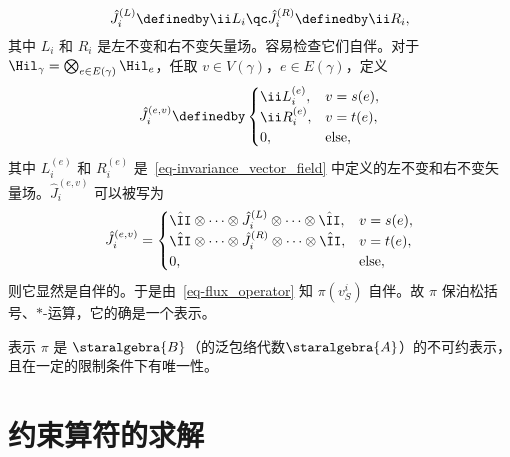 			\begin{equation}
				\hat{J}^{(L)}_i \definedby \ii L_i \qc \hat{J}^{(R)}_i \definedby \ii R_i,
			\end{equation}
			其中 $L_i$ 和 $R_i$ 是左不变和右不变矢量场。容易检查它们自伴。对于 $\Hil_\gamma = \bigotimes_{e\in E(\gamma)} \Hil_e$，任取 $v\in V(\gamma)$，$e\in E(\gamma)$，定义
			\begin{equation}
				\hat{J}^{(e,v)}_i \definedby
				\begin{cases}
					\ii L^{(e)}_i, & v=s(e),\\
					\ii R^{(e)}_i, & v=t(e),\\
					0, & \text{else},
				\end{cases}
			\end{equation}
			其中 $L_i^{(e)}$ 和 $R_i^{(e)}$ 是~\eqref{eq-invariance_vector_field} 中定义的左不变和右不变矢量场。$\hat{J}^{(e,v)}_i$ 可以被写为
			\begin{equation}
				\hat{J}^{(e,v)}_i =
				\begin{cases}
					\hat{\II} \otimes \cdots \otimes \hat{J}_i^{(L)} \otimes \cdots \otimes \hat{\II}, & v=s(e),\\
					\hat{\II} \otimes \cdots \otimes \hat{J}_i^{(R)} \otimes \cdots \otimes \hat{\II}, & v=t(e),\\
					0, & \text{else},
				\end{cases}
			\end{equation}
			则它显然是自伴的。于是由~\eqref{eq-flux_operator} 知 $\pi\left(v^i_S\right)$ 自伴。故 $\pi$ 保泊松括号、$*$-运算，它的确是一个表示。
			\begin{Theorem}
				表示 $\pi$ 是 $\staralgebra{B}$（的泛包络代数$\staralgebra{A}$）的不可约表示，且在一定的限制条件下有唯一性。
			\end{Theorem}
	\section{约束算符的求解}

